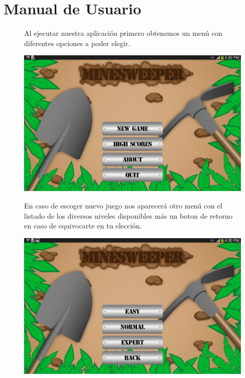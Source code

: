 \documentclass[11pt]{article}
\begin{document}
\section{Manual de Usuario}

\begin{figure}[h!]
\begin{minipage}{0.5 \textwidth}
Al ejecutar nuestra aplicación primero obtenemos un menú con diferentes opciones a poder elegir.
\end{minipage}
\hfill \begin{minipage}{6.5cm}
\begin{center}
 \includegraphics[width=1\textwidth]{images/screenshot1}
\end{center}
\end{minipage}
\end{figure}

\begin{figure}[h!]
\begin{minipage}{0.5 \textwidth}
En caso de escoger nuevo juego nos aparecerá otro menú con el listado de los diversos niveles disponibles más un boton de retorno en caso de equivocarte en tu elección.
\end{minipage}
\hfill \begin{minipage}{6.5cm}
\begin{center}
 \includegraphics[width=1\textwidth]{images/screenshot2}
\end{center}
\end{minipage}
\end{figure}
\end{document}
